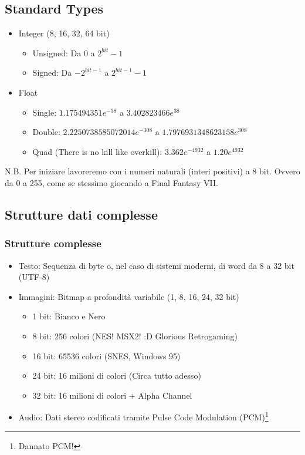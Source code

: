 \documentclass{beamer}
\begin{document}
  \subsection{Standard Types}
  \begin{frame}   	
    \begin{itemize}
    		\item Integer (8, 16, 32, 64 bit)
    			\begin{itemize}
    				\item Unsigned: Da 0 a $2^{bit}-1$
    				\item Signed: Da $-2^{bit-1}$ a $2^{bit-1}-1$
    			\end{itemize}
    		\item Float
    			\begin{itemize}
    				\item Single: $1.175494351e^{-38}$ a $3.402823466e^{38}$
    				\item Double: $2.2250738585072014e^{-308}$ a $1.7976931348623158e^{308}$
    				\item Quad (There is no kill like overkill): $3.362e^{-4932}$ a $1.20e^{4932}$
    			\end{itemize}
    \end{itemize}

		\begin{block}{N.B.}
			Per iniziare lavoreremo con i numeri naturali (interi positivi) a 8 bit. Ovvero da 0 a 255,
			come se stessimo giocando a Final Fantasy VII.
		\end{block}
  \end{frame}
  \subsection{Strutture dati complesse}
  \begin{frame}
    \frametitle{Strutture complesse}
    \begin{itemize}
    		\item Testo: Sequenza di byte o, nel caso di sistemi moderni, di word da 8 a 32 bit (UTF-8)
    		\item Immagini: Bitmap a profondità variabile (1, 8, 16, 24, 32 bit)
    			\begin{itemize}
    				\item 1 bit: Bianco e Nero
    				\item 8 bit: 256 colori (NES! MSX2! :D Glorious Retrogaming)
    				\item 16 bit: 65536 colori (SNES, Windows 95)
    				\item 24 bit: 16 milioni di colori (Circa tutto adesso)
    				\item 32 bit: 16 milioni di colori + Alpha Channel
    			\end{itemize}
    		\item Audio: Dati stereo codificati tramite Pulse Code Modulation (PCM)\footnote{Dannato PCM!}
    \end{itemize}
  \end{frame} 
  
\end{document}

